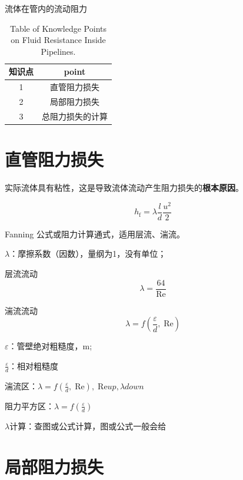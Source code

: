 \documentclass{book}
\DeclareRobustCommand{\bluebold}[1]{\textbf{\textcolor[rgb]{0.31,0.63,0.86}{#1}}}
\begin{document}
\tableofcontents
\clearpage

流体在管内的流动阻力

\begin{table}[htbp]
\centering
\begin{tabular}{c c} 
\toprule
知识点 & point\\ [0.5ex] 
\midrule
1 & 直管阻力损失 \\
2 & 局部阻力损失 \\
3 & 总阻力损失的计算 \\
\bottomrule
\end{tabular}
\caption{Table of Knowledge Points on Fluid Resistance Inside Pipelines.}
\label{table:data}
\end{table}

\chapter{直管阻力损失}

实际流体具有粘性，这是导致流体流动产生阻力损失的\bluebold{根本原因}。

\begin{equation}
h_\mathrm{f} = \lambda \frac{l}{d} \frac{u^2}{2}
\label{eq:fanning}
\end{equation}

Fanning 公式或阻力计算通式，适用层流、湍流。

$\lambda$：摩擦系数（因数），量纲为1，没有单位；


层流流动
\begin{equation}
\lambda = \frac{64}{\mathrm{Re}}
\label{eq:lambda-laminar}
\end{equation}

湍流流动
\begin{equation}
\lambda = f\left(\frac{\varepsilon}{d},\; \mathrm{Re}\right)
\label{eq:lambda-turbulent}
\end{equation}

$\varepsilon$：管壁绝对粗糙度，m;

$\frac{\varepsilon}{d}$：相对粗糙度

湍流区：$\lambda = f\left(\frac{\varepsilon}{d},\; \mathrm{Re}\right),\; \mathrm{Re} up, \lambda down$

阻力平方区：$\lambda = f(\frac{\varepsilon}{d})$

$\lambda$计算：查图或公式计算，图或公式一般会给

\chapter{局部阻力损失}
\end{document}

